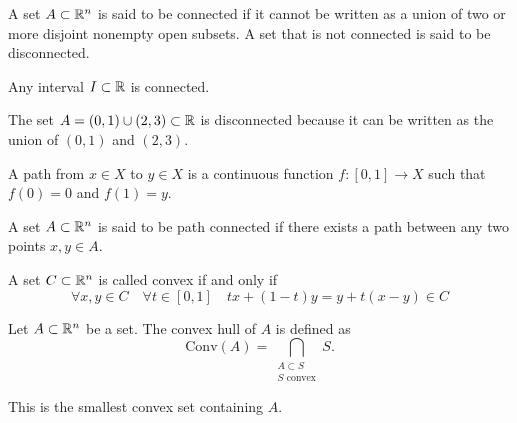 \documentclass[11pt,a4paper]{article}
\begin{document}
\begin{definition}[Connectedness]
  A set $A \subset \mathbb{R}^n$ is said to be connected if it cannot be
  written as a union of two or more disjoint nonempty open subsets.
  A set that is not connected is said to be disconnected.
\end{definition}

\begin{example}
  Any interval $I \subset \mathbb{R}$ is connected.
\end{example}

\begin{example}
  The set $A = (0,1) \cup (2,3) \subset \mathbb{R}$ is disconnected because
  it can be written as the union of $(0,1)$ and $(2,3)$.
\end{example}

\begin{definition}[Path]
  A path from $x \in X$ to $y \in X$ is a continuous function 
  $f \colon [0,1] \to X$ such that $f(0) = 0$ and $f(1) = y$.
\end{definition}

\begin{definition}
  A set $A \subset \mathbb{R}^n$ is said to be path connected if there exists a path
  between any two points $x,y \in A$.
\end{definition}

\begin{definition}
  A set $C \subset \mathbb{R}^n$ is called convex if and only if
  \[
    \forall x,y \in C \quad \forall t \in [0,1] \quad
    tx + (1-t)y = y + t(x-y) \in C
  \]
\end{definition}

\begin{definition}
  Let $A \subset \mathbb{R}^n$ be a set.
  The convex hull of $A$ is defined as
  \[
    \mathrm{Conv}(A) = 
    \bigcap_{\substack{A \subset S \\ S \text{ convex}}} S.
  \]
\end{definition}
\begin{remark}
  This is the smallest convex set containing $A$.
\end{remark}

\newpage


\newpage
\end{document}

